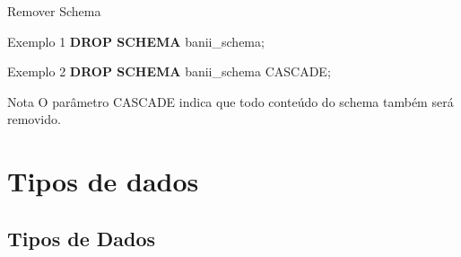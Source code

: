 \documentclass[xcolor=x11names,compress]{beamer}
\begin{document}
\begin{frame}{Remover Schema}

\begin{alertblock}{Exemplo 1}
\centering \textbf{DROP SCHEMA} banii\_schema;
\end{alertblock}

\begin{alertblock}{Exemplo 2}
\centering \textbf{DROP SCHEMA} banii\_schema CASCADE;
\end{alertblock}

\pause

\begin{alertblock}{\centering Nota}
O parâmetro CASCADE indica que todo conteúdo do schema também será removido.
\end{alertblock}

\end{frame}

\section{Tipos de dados}
\subsection{Tipos de Dados}
\end{document}
